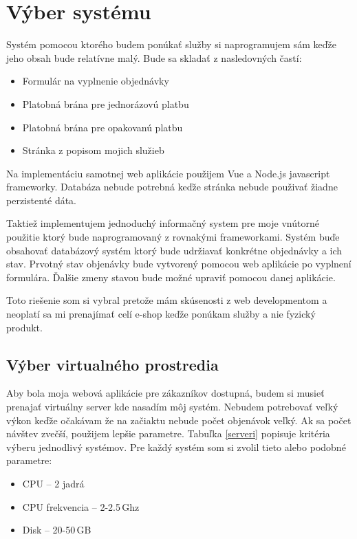 \chapter{Výber systému}

Systém pomocou ktorého budem ponúkať služby si naprogramujem sám keďže jeho obsah bude relatívne malý. Bude sa skladať z nasledovných častí:

\begin{itemize}
  \item Formulár na vyplnenie objednávky
  \item Platobná brána pre jednorázovú platbu
  \item Platobná brána pre opakovanú platbu
  \item Stránka z popisom mojich služieb
\end{itemize}

Na implementáciu samotnej web aplikácie použijem Vue \cite{vue} a Node.js \cite{Node} javascript frameworky. Databáza nebude potrebná keďže stránka nebude použivať žiadne perzistenté dáta.

Taktiež implementujem jednoduchý informačný system pre moje vnútorné použitie ktorý bude naprogramovaný z rovnakými frameworkami. Systém buďe obsahovať databázový systém ktorý bude udržiavať konkrétne objednávky a ich stav. Prvotný stav objenávky bude vytvorený pomocou web aplikácie po vyplnení formulára. Ďalšie zmeny stavou bude možné upraviť pomocou danej aplikácie.

Toto riešenie som si vybral pretože mám skúsenosti z web developmentom a neoplatí sa mi prenajímať celí e-shop keďže ponúkam služby a nie fyzický produkt.

\section{Výber virtualného prostredia}
\label{vyber}

Aby bola moja webová aplikácie pre zákazníkov dostupná, budem si musieť prenajať virtuálny server kde nasadím môj systém. Nebudem potrebovať veľký výkon keďže očakávam že na začiaktu nebude počet objenávok veľký. Ak sa počet návštev zvečší, použijem lepšie parametre. Tabuľka \ref{serveri} popisuje kritéria výberu jednodlivý systémov. Pre každý systém som si zvolil tieto alebo podobné parametre:

\begin{itemize}
  \item CPU -- 2 jadrá
  \item CPU frekvencia -- 2-2.5\,Ghz
  \item Disk -- 20-50\,GB
\end{itemize}

